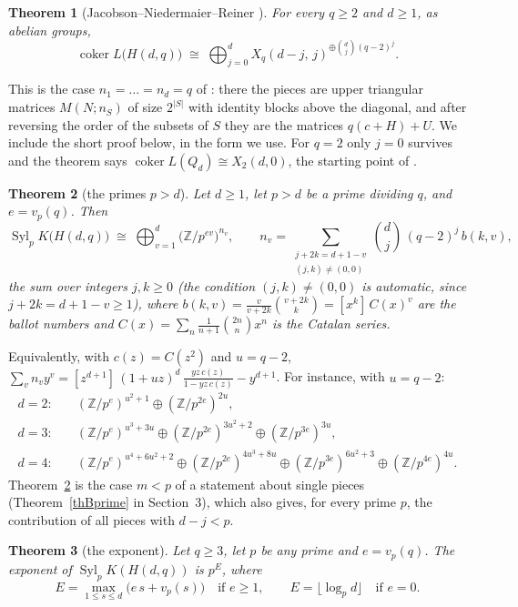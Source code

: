 \documentclass[10pt]{article}
\theoremstyle{ds}
\newtheorem{theorem}{Theorem}
\theoremstyle{dsrem}
\newcommand{\Z}{\mathbb{Z}}
\newcommand{\Syl}{\operatorname{Syl}}
\newcommand{\coker}{\operatorname{coker}}
\begin{document}
\begin{theorem}[Jacobson--Niedermaier--Reiner {\cite[Theorem~13]{JNR}}]\label{thA}
For every $q\ge2$ and $d\ge1$, as abelian groups,
\[
\coker L\big(H(d,q)\big)\;\cong\;\bigoplus_{j=0}^{d} X_q(d-j,\,j)^{\oplus\binom dj (q-2)^j}.
\]
\end{theorem}

This is the case $n_1=\dots=n_d=q$ of \cite[Theorem~13]{JNR}: there the pieces are upper triangular matrices $M(N;n_S)$ of size $2^{|S|}$ with identity blocks above the diagonal, and after reversing the order of the subsets of $S$ they are the matrices $q(c+H)+U$. We include the short proof below, in the form we use. For $q=2$ only $j=0$ survives and the theorem says $\coker L(Q_d)\cong X_2(d,0)$, the starting point of \cite{DST}.

\begin{theorem}[the primes $p>d$]\label{thB}
Let $d\ge1$, let $p>d$ be a prime dividing $q$, and $e=v_p(q)$. Then
\[
\Syl_p K\big(H(d,q)\big)\;\cong\;\bigoplus_{v=1}^{d}\big(\Z/p^{ev}\big)^{n_v},\qquad
n_v=\sum_{\substack{j+2k=d+1-v\\ (j,k)\neq(0,0)}}\binom{d}{j}\,(q-2)^{j}\,b(k,v),
\]
the sum over integers $j,k\ge0$ (the condition $(j,k)\ne(0,0)$ is automatic, since $j+2k=d+1-v\ge1$), where $b(k,v)=\frac{v}{v+2k}\binom{v+2k}{k}=[x^k]\,C(x)^v$ are the ballot numbers and $C(x)=\sum_n\frac1{n+1}\binom{2n}nx^n$ is the Catalan series.
\end{theorem}

Equivalently, with $c(z)=C(z^2)$ and $u=q-2$, $\sum_v n_v y^v=[z^{d+1}]\,(1+uz)^d\,\frac{yz\,c(z)}{1-yz\,c(z)}-y^{d+1}$. For instance, with $u=q-2$:
\begin{align*}
d=2:&\quad (\Z/p^{e})^{u^2+1}\oplus(\Z/p^{2e})^{2u},\\
d=3:&\quad (\Z/p^{e})^{u^3+3u}\oplus(\Z/p^{2e})^{3u^2+2}\oplus(\Z/p^{3e})^{3u},\\
d=4:&\quad (\Z/p^{e})^{u^4+6u^2+2}\oplus(\Z/p^{2e})^{4u^3+8u}\oplus(\Z/p^{3e})^{6u^2+3}\oplus(\Z/p^{4e})^{4u}.
\end{align*}
Theorem~\ref{thB} is the case $m<p$ of a statement about single pieces (Theorem~\ref{thBprime} in Section~3), which also gives, for every prime $p$, the contribution of all pieces with $d-j<p$.

\begin{theorem}[the exponent]\label{thC}
Let $q\ge3$, let $p$ be any prime and $e=v_p(q)$. The exponent of $\Syl_p K(H(d,q))$ is $p^{E}$, where
\[
E=\max_{1\le s\le d}\big(e\,s+v_p(s)\big)\quad\text{if } e\ge1,\qquad E=\lfloor\log_p d\rfloor\quad\text{if } e=0 .
\]
\end{theorem}
\end{document}
